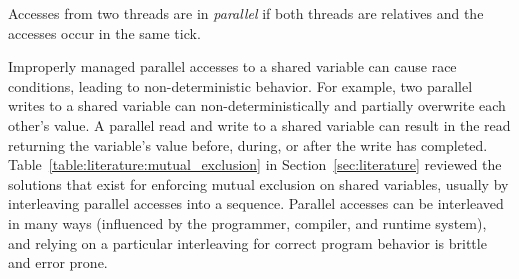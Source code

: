 \begin{definition}
	\label{def:forec:access_parallel}
	Accesses from two threads are in \emph{parallel} if both 
	threads are relatives and the accesses occur in the same tick.
\end{definition}

Improperly managed parallel accesses to a shared variable
can cause race conditions, leading to non-deterministic 
behavior. For example, two parallel writes to a
shared variable can non-deterministically and partially
overwrite each other's value. A parallel read and write to a
shared variable can result in the read returning the
variable's value before, during, or after the write has
completed. Table~\ref{table:literature:mutual_exclusion} 
in Section~\ref{sec:literature} reviewed 
the solutions that exist for enforcing mutual
exclusion on shared variables, usually by
interleaving parallel accesses into a sequence.
Parallel accesses can be interleaved in many ways
(influenced by the programmer, compiler, and runtime system),
and relying on a particular interleaving for correct program
behavior is brittle and error prone.

%

